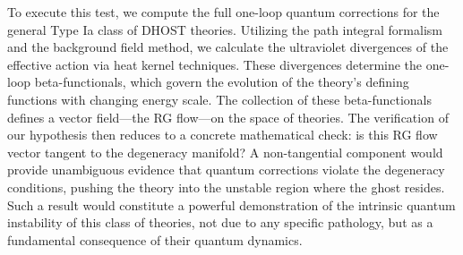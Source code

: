 \documentclass[twocolumn]{aastex631}
\begin{document}
To execute this test, we compute the full one-loop quantum corrections for the general Type Ia class of DHOST theories. Utilizing the path integral formalism and the background field method, we calculate the ultraviolet divergences of the effective action via heat kernel techniques. These divergences determine the one-loop beta-functionals, which govern the evolution of the theory's defining functions with changing energy scale. The collection of these beta-functionals defines a vector field---the RG flow---on the space of theories. The verification of our hypothesis then reduces to a concrete mathematical check: is this RG flow vector tangent to the degeneracy manifold? A non-tangential component would provide unambiguous evidence that quantum corrections violate the degeneracy conditions, pushing the theory into the unstable region where the ghost resides. Such a result would constitute a powerful demonstration of the intrinsic quantum instability of this class of theories, not due to any specific pathology, but as a fundamental consequence of their quantum dynamics.
\end{document}
